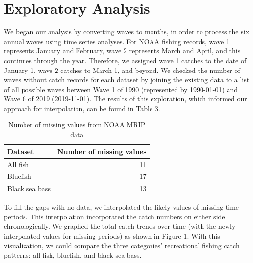 \documentclass[
  12pt,
]{article}
\begin{document}
\hypertarget{exploratory-analysis}{%
\section{Exploratory Analysis}\label{exploratory-analysis}}

We began our analysis by converting waves to months, in order to process
the six annual waves using time series analyses. For NOAA fishing
records, wave 1 represents January and February, wave 2 represents March
and April, and this continues through the year. Therefore, we assigned
wave 1 catches to the date of January 1, wave 2 catches to March 1, and
beyond. We checked the number of waves without catch records for each
dataset by joining the existing data to a list of all possible waves
between Wave 1 of 1990 (represented by 1990-01-01) and Wave 6 of 2019
(2019-11-01). The results of this exploration, which informed our
approach for interpolation, can be found in Table 3.

\begin{table}[H]

\caption{\label{tab:table3}Number of missing values from NOAA MRIP data}
\centering
\begin{tabular}[t]{l|r}
\hline
Dataset & Number of missing values\\
\hline
All fish & 11\\
\hline
Bluefish & 17\\
\hline
Black sea bass & 13\\
\hline
\end{tabular}
\end{table}

To fill the gaps with no data, we interpolated the likely values of
missing time periods. This interpolation incorporated the catch numbers
on either side chronologically. We graphed the total catch trends over
time (with the newly interpolated values for missing periods) as shown
in Figure 1. With this visualization, we could compare the three
categories' recreational fishing catch patterns: all fish, bluefish, and
black sea bass.
\end{document}
